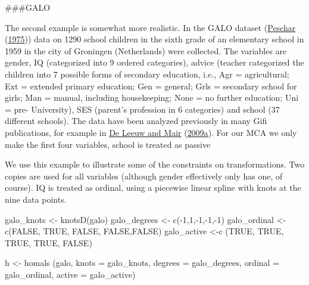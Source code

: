 \documentclass[
  12pt,
]{book}
\newenvironment{Shaded}{\begin{snugshade}}{\end{snugshade}}
\newcommand{\AttributeTok}[1]{\textcolor[rgb]{0.77,0.63,0.00}{#1}}
\newcommand{\ConstantTok}[1]{\textcolor[rgb]{0.00,0.00,0.00}{#1}}
\newcommand{\DecValTok}[1]{\textcolor[rgb]{0.00,0.00,0.81}{#1}}
\newcommand{\FunctionTok}[1]{\textcolor[rgb]{0.00,0.00,0.00}{#1}}
\newcommand{\NormalTok}[1]{#1}
\newcommand{\OtherTok}[1]{\textcolor[rgb]{0.56,0.35,0.01}{#1}}
\newcommand{\SpecialCharTok}[1]{\textcolor[rgb]{0.00,0.00,0.00}{#1}}
\begin{document}
\#\#\#GALO

The second example is somewhat more realistic. In the GALO dataset (\protect\hyperlink{ref-peschar_75}{Peschar} (\protect\hyperlink{ref-peschar_75}{1975})) data on 1290 school children in the sixth grade of an elementary school in 1959 in the city of Groningen (Netherlands) were collected. The variables are gender, IQ (categorized into 9 ordered categories), advice (teacher categorized the children into 7 possible forms of secondary education, i.e., Agr = agricultural; Ext = extended primary education; Gen = general; Grls = secondary school for girls; Man = manual, including housekeeping; None = no further education; Uni = pre- University), SES (parent's profession in 6 categories) and school (37 different schools). The data have been analyzed previously in many Gifi publications, for example in \protect\hyperlink{ref-deleeuw_mair_A_09a}{De Leeuw and Mair} (\protect\hyperlink{ref-deleeuw_mair_A_09a}{2009a}). For our MCA we only make the first four variables, school is treated as passive

We use this example to illustrate some of the constraints on transformations. Two copies are used for all variables (although gender effectively only has one, of course). IQ is treated as ordinal, using a piecewise linear spline with knots at the nine data points.

\begin{Shaded}
\begin{Highlighting}[]
\NormalTok{galo\_knots }\OtherTok{\textless{}{-}} \FunctionTok{knotsD}\NormalTok{(galo)}
\NormalTok{galo\_degrees }\OtherTok{\textless{}{-}} \FunctionTok{c}\NormalTok{(}\SpecialCharTok{{-}}\DecValTok{1}\NormalTok{,}\DecValTok{1}\NormalTok{,}\SpecialCharTok{{-}}\DecValTok{1}\NormalTok{,}\SpecialCharTok{{-}}\DecValTok{1}\NormalTok{,}\SpecialCharTok{{-}}\DecValTok{1}\NormalTok{)}
\NormalTok{galo\_ordinal }\OtherTok{\textless{}{-}} \FunctionTok{c}\NormalTok{(}\ConstantTok{FALSE}\NormalTok{, }\ConstantTok{TRUE}\NormalTok{, }\ConstantTok{FALSE}\NormalTok{, }\ConstantTok{FALSE}\NormalTok{,}\ConstantTok{FALSE}\NormalTok{)}
\NormalTok{galo\_active }\OtherTok{\textless{}{-}}\FunctionTok{c}\NormalTok{ (}\ConstantTok{TRUE}\NormalTok{, }\ConstantTok{TRUE}\NormalTok{, }\ConstantTok{TRUE}\NormalTok{, }\ConstantTok{TRUE}\NormalTok{, }\ConstantTok{FALSE}\NormalTok{)}
\end{Highlighting}
\end{Shaded}

\begin{Shaded}
\begin{Highlighting}[]
\NormalTok{h }\OtherTok{\textless{}{-}} \FunctionTok{homals}\NormalTok{ (galo, }\AttributeTok{knots =}\NormalTok{ galo\_knots, }\AttributeTok{degrees =}\NormalTok{ galo\_degrees, }\AttributeTok{ordinal =}\NormalTok{ galo\_ordinal, }\AttributeTok{active =}\NormalTok{ galo\_active)}
\end{Highlighting}
\end{Shaded}
\end{document}
